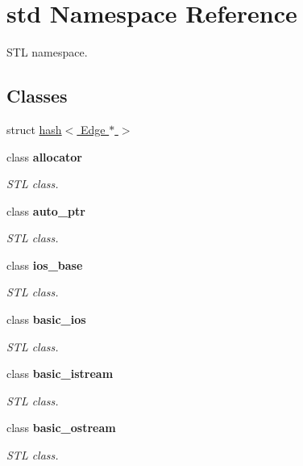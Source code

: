 \hypertarget{namespacestd}{
\section{std Namespace Reference}
\label{namespacestd}
}


STL namespace.  
\subsection*{Classes}
\begin{DoxyCompactItemize}
\item 
struct \hyperlink{structstd_1_1hash_3_01Edge_01_5_01_4}{hash$<$ Edge $\ast$ $>$}
\item 
class {\bfseries allocator}
\begin{DoxyCompactList}\small\item\em STL class. \item\end{DoxyCompactList}\item 
class {\bfseries auto\_\-ptr}
\begin{DoxyCompactList}\small\item\em STL class. \item\end{DoxyCompactList}\item 
class {\bfseries ios\_\-base}
\begin{DoxyCompactList}\small\item\em STL class. \item\end{DoxyCompactList}\item 
class {\bfseries basic\_\-ios}
\begin{DoxyCompactList}\small\item\em STL class. \item\end{DoxyCompactList}\item 
class {\bfseries basic\_\-istream}
\begin{DoxyCompactList}\small\item\em STL class. \item\end{DoxyCompactList}\item 
class {\bfseries basic\_\-ostream}
\begin{DoxyCompactList}\small\item\em STL class. \item\end{DoxyCompactList}\item 

\end{DoxyCompactItemize}

